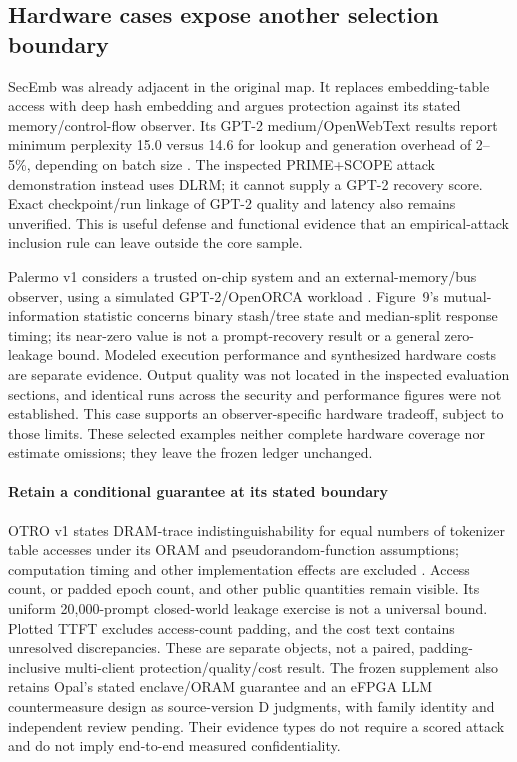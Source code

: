 \subsection{Hardware cases expose another selection boundary}
SecEmb was already adjacent in the original map. It replaces embedding-table access with deep hash embedding and argues protection against its stated memory/control-flow observer. Its GPT-2 medium/OpenWebText results report minimum perplexity 15.0 versus 14.6 for lookup and generation overhead of 2--5\%, depending on batch size \cite[V-B,VI-D]{umar2025secemb}. The inspected PRIME+SCOPE attack demonstration instead uses DLRM; it cannot supply a GPT-2 recovery score. Exact checkpoint/run linkage of GPT-2 quality and latency also remains unverified. This is useful defense and functional evidence that an empirical-attack inclusion rule can leave outside the core sample.

Palermo v1 considers a trusted on-chip system and an external-memory/bus observer, using a simulated GPT-2/OpenORCA workload \cite[II-B,VI--VIII]{ye2024palermo}. Figure~9's mutual-information statistic concerns binary stash/tree state and median-split response timing; its near-zero value is not a prompt-recovery result or a general zero-leakage bound. Modeled execution performance and synthesized hardware costs are separate evidence. Output quality was not located in the inspected evaluation sections, and identical runs across the security and performance figures were not established. This case supports an observer-specific hardware tradeoff, subject to those limits. These selected examples neither complete hardware coverage nor estimate omissions; they leave the frozen ledger unchanged.

\paragraph{Retain a conditional guarantee at its stated boundary}
OTRO v1 states DRAM-trace indistinguishability for equal numbers of tokenizer table accesses under its ORAM and pseudorandom-function assumptions; computation timing and other implementation effects are excluded \cite[III,V--VII, Appendix~B]{lee2026otro}. Access count, or padded epoch count, and other public quantities remain visible. Its uniform 20,000-prompt closed-world leakage exercise is not a universal bound. Plotted TTFT excludes access-count padding, and the cost text contains unresolved discrepancies. These are separate objects, not a paired, padding-inclusive multi-client protection/quality/cost result. The frozen supplement also retains Opal's stated enclave/ORAM guarantee and an eFPGA LLM countermeasure design as source-version D judgments, with family identity and independent review pending. Their evidence types do not require a scored attack and do not imply end-to-end measured confidentiality.

